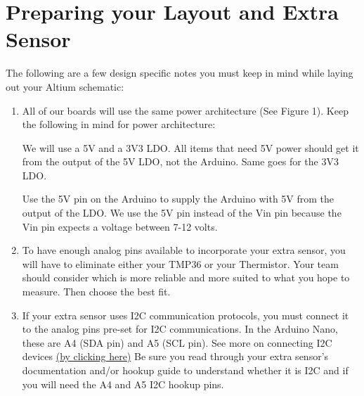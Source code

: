 \documentclass[12pt]{article}
\begin{document}
    \section*{Preparing your Layout and Extra Sensor}
    The following are a few design specific notes you must keep in mind while laying out your Altium schematic:
    \begin{enumerate}
        \item All of our boards will use the same power architecture (See Figure 1). Keep the following in mind for power architecture:
        
        \subitem We will use a 5V and a 3V3 LDO. All items that need 5V power should get it from the output of the 5V LDO, not the Arduino. Same goes for the 3V3 LDO.
        
        \subitem Use the 5V pin on the Arduino to supply the Arduino with 5V from the output of the LDO. We use the 5V pin instead of the Vin pin because the Vin pin expects a voltage between 7-12 volts.
        
        \item To have enough analog pins available to incorporate your extra sensor, you will have to eliminate either your TMP36 or your Thermistor. Your team should consider which is more reliable and more suited to what you hope to measure. Then choose the best fit. 
        
        \item If your extra sensor uses I2C communication protocols, you must connect it to the analog pins pre-set for I2C communications. In the Arduino Nano, these are A4 (SDA pin) and A5 (SCL pin). See more on connecting I2C devices \href{https://www.lehelmatyus.com/691/sda-scl-arduino-nano-connecting-i2c-devices-arduino-nano}{(by clicking here)} Be sure you read through your extra sensor's documentation and/or hookup guide to understand whether it is I2C and if you will need the A4 and A5 I2C hookup pins.
    \end{enumerate}
    
\end{document}
